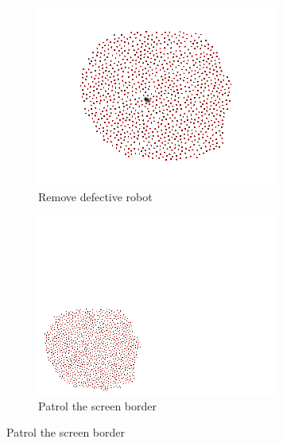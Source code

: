 \documentclass[]{article}
\begin{document}
\begin{figure}
\begin{subfigure}{0.42\textwidth}
		\includegraphics[width=\linewidth]{slide_images/Swarm_Robot_Control_-_1000_Robot_0031.png}
		\caption{Remove defective robot}
		\label{fig:sub2}
	\end{subfigure}%
	\begin{subfigure}{0.42\textwidth}
		\centering
		\includegraphics[width=\linewidth]{slide_images/Swarm_Robot_Control_-_1000_Robot_0033.png}
		\caption{Patrol the screen border}
		\label{fig:sub1}
	\end{subfigure}
\end{figure}
\end{document}
